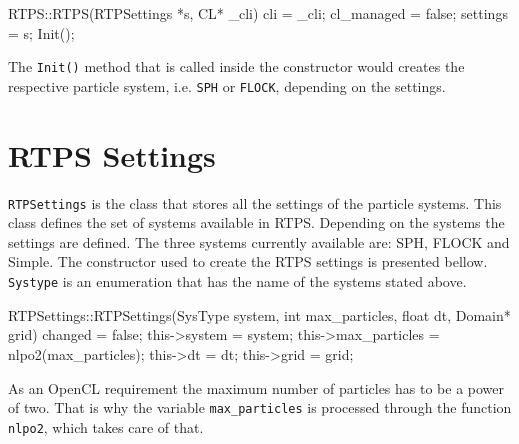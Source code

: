 
\begin{cppcode}{0}
RTPS::RTPS(RTPSettings *s, CL* _cli) 
{
	cli = _cli;
 	cl_managed = false;
	settings = s;
	Init();
}
\end{cppcode}

The \texttt{Init()} method that is called inside the constructor would creates the respective particle system, i.e. \texttt{SPH} or \texttt{FLOCK}, depending on the settings.

\section{RTPS Settings}\label{rtpsettings}
\texttt{RTPSettings} is the class that stores all the settings of the particle systems. This class defines the set of systems available in RTPS. Depending on the systems the settings are defined. The three systems currently available are: SPH, FLOCK and Simple. The constructor used to create the RTPS  settings is presented bellow. \texttt{Systype} is an enumeration that has the name of the systems stated above.


\begin{cppcode}{0}
RTPSettings::RTPSettings(SysType system, int max_particles, float dt, Domain* grid)
{
	changed = false;
	this->system = system;
	this->max_particles = nlpo2(max_particles);
	this->dt = dt;
	this->grid = grid;
}
\end{cppcode}


As an OpenCL requirement the maximum number of particles has to be a power of two. That is why the variable \texttt{max\_particles} is processed through the function \texttt{nlpo2}, which takes care of that.

